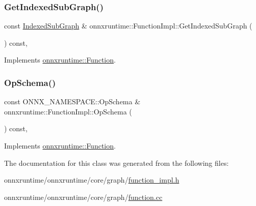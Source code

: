 \subsubsection{\texorpdfstring{Get\+Indexed\+Sub\+Graph()}{GetIndexedSubGraph()}}
{\footnotesize\ttfamily const \mbox{\hyperlink{structonnxruntime_1_1IndexedSubGraph}{Indexed\+Sub\+Graph}} \& onnxruntime\+::\+Function\+Impl\+::\+Get\+Indexed\+Sub\+Graph (\begin{DoxyParamCaption}{ }\end{DoxyParamCaption}) const\hspace{0.3cm}{\ttfamily [override]}, {\ttfamily [virtual]}}



Implements \mbox{\hyperlink{classonnxruntime_1_1Function_a017f5155e74c32b1e3cd42e6c0f94d91}{onnxruntime\+::\+Function}}.

\mbox{\label{classonnxruntime_1_1FunctionImpl_ad003c6cab0d96bd8cd96d2bb5abfce50}} 
\subsubsection{\texorpdfstring{Op\+Schema()}{OpSchema()}}
{\footnotesize\ttfamily const O\+N\+N\+X\+\_\+\+N\+A\+M\+E\+S\+P\+A\+C\+E\+::\+Op\+Schema \& onnxruntime\+::\+Function\+Impl\+::\+Op\+Schema (\begin{DoxyParamCaption}{ }\end{DoxyParamCaption}) const\hspace{0.3cm}{\ttfamily [override]}, {\ttfamily [virtual]}}



Implements \mbox{\hyperlink{classonnxruntime_1_1Function_aad1b1f67422088275cb4ce6470aa906a}{onnxruntime\+::\+Function}}.



The documentation for this class was generated from the following files\+:\begin{DoxyCompactItemize}
\item 
onnxruntime/onnxruntime/core/graph/\mbox{\hyperlink{function__impl_8h}{function\+\_\+impl.\+h}}\item 
onnxruntime/onnxruntime/core/graph/\mbox{\hyperlink{function_8cc}{function.\+cc}}\end{DoxyCompactItemize}
